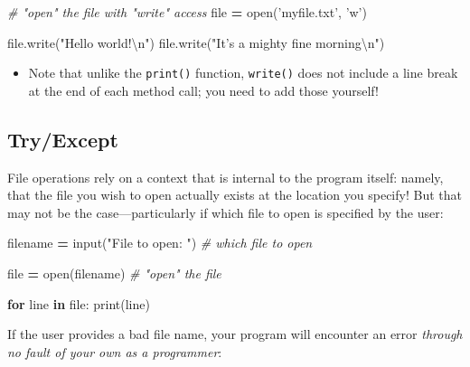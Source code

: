 \documentclass[]{book}
\newenvironment{Shaded}{\begin{snugshade}}{\end{snugshade}}
\newcommand{\KeywordTok}[1]{\textcolor[rgb]{0.13,0.29,0.53}{\textbf{#1}}}
\newcommand{\CharTok}[1]{\textcolor[rgb]{0.31,0.60,0.02}{#1}}
\newcommand{\StringTok}[1]{\textcolor[rgb]{0.31,0.60,0.02}{#1}}
\newcommand{\CommentTok}[1]{\textcolor[rgb]{0.56,0.35,0.01}{\textit{#1}}}
\newcommand{\FunctionTok}[1]{\textcolor[rgb]{0.00,0.00,0.00}{#1}}
\newcommand{\ControlFlowTok}[1]{\textcolor[rgb]{0.13,0.29,0.53}{\textbf{#1}}}
\newcommand{\OperatorTok}[1]{\textcolor[rgb]{0.81,0.36,0.00}{\textbf{#1}}}
\newcommand{\BuiltInTok}[1]{#1}
\newcommand{\ExtensionTok}[1]{#1}
\newcommand{\NormalTok}[1]{#1}
\providecommand{\tightlist}{%
  \setlength{\itemsep}{0pt}\setlength{\parskip}{0pt}}
\begin{document}
\begin{Shaded}
\begin{Highlighting}[]
\CommentTok{# "open" the file with "write" access}
\BuiltInTok{file} \OperatorTok{=} \BuiltInTok{open}\NormalTok{(}\StringTok{'myfile.txt'}\NormalTok{, }\StringTok{'w'}\NormalTok{)}

\BuiltInTok{file}\NormalTok{.write(}\StringTok{"Hello world!}\CharTok{\textbackslash{}n}\StringTok{"}\NormalTok{)}
\BuiltInTok{file}\NormalTok{.write(}\StringTok{"It's a mighty fine morning}\CharTok{\textbackslash{}n}\StringTok{"}\NormalTok{)}
\end{Highlighting}
\end{Shaded}

\begin{itemize}
\tightlist
\item
  Note that unlike the \texttt{print()} function, \texttt{write()} does
  not include a line break at the end of each method call; you need to
  add those yourself!
\end{itemize}

\hypertarget{tryexcept}{\subsection{Try/Except}\label{tryexcept}}

File operations rely on a context that is internal to the program
itself: namely, that the file you wish to open actually exists at the
location you specify! But that may not be the case---particularly if
which file to open is specified by the user:

\begin{Shaded}
\begin{Highlighting}[]
\NormalTok{filename }\OperatorTok{=} \BuiltInTok{input}\NormalTok{(}\StringTok{"File to open: "}\NormalTok{)  }\CommentTok{# which file to open}

\BuiltInTok{file} \OperatorTok{=} \BuiltInTok{open}\NormalTok{(filename)  }\CommentTok{# "open" the file}

\ControlFlowTok{for}\NormalTok{ line }\KeywordTok{in} \BuiltInTok{file}\NormalTok{:}
    \BuiltInTok{print}\NormalTok{(line)}
\end{Highlighting}
\end{Shaded}

If the user provides a bad file name, your program will encounter an
error \emph{through no fault of your own as a programmer}:

\begin{Shaded}
\end{Shaded}
\end{document}
